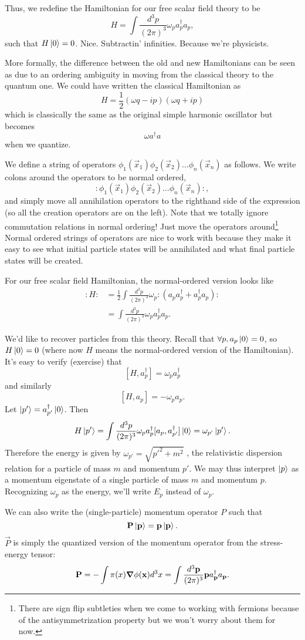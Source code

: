 Thus, we redefine the Hamiltonian for our free scalar field theory to be
$$H=\int \frac{d^3 p}{(2\pi)^3} \omega_p a_p^\dagger a_p,$$
such that $H\left| 0 \right>=0$. Nice. Subtractin' infinities. Because we're physicists.

More formally, the difference between the old and new Hamiltonians can be seen as due to an ordering ambiguity in moving from the classical theory to the quantum one. We could have written the classical Hamiltonian as
$$H=\frac{1}{2}(\omega q-ip)(\omega q+ ip)$$
which is classically the same as the original simple harmonic oscillator but becomes
$$\omega a^\dagger a$$ when we quantize.

\begin{defn}
We define a  string of operators $\phi_1(\vec x_1)\phi_2 (\vec x_2)\ldots \phi_n (\vec x_n)$ as follows.
We write colons around the operators to be normal ordered,
$$: \phi_1(\vec x_1)\phi_2 (\vec x_2)\ldots \phi_n (\vec x_n):,$$
and simply move all annihilation operators to the righthand side of the expression (so all the creation operators are on the left). Note that we totally ignore commutation relations in normal ordering! Just move the operators around\footnote{There are sign flip subtleties when we come to working with fermions because of the antisymmetrization property but we won't worry about them for now.} Normal ordered strings of operators are nice to work with because they make it easy to see what initial particle states will be annihilated and what final particle states will be created.
\end{defn}
\begin{exm}
For our free scalar field Hamiltonian, the normal-ordered version looks like
\begin{align*}
:H:&= \frac{1}{2} \int \frac{d^3p}{(2\pi)^3} \omega_p :(a_p a_p^\dagger + a_p^\dagger a_p):\\
&=\int \frac{d^3p}{(2\pi)^3} \omega_p a_p^\dagger a_p.
\end{align*}
\end{exm}

We'd like to recover particles from this theory. Recall that $\forall p, a_p\left| 0 \right>=0$, so $H\left| 0 \right>=0$ (where now $H$ means the normal-ordered version of the Hamiltonian). It's easy to verify (exercise) that
$$[H,a_p^\dagger] =\omega_p a_p^\dagger$$
and similarly
$$[H,a_p]=-\omega_p a_p.$$
Let $\left| p' \right>=a^\dagger_{p'}\left| 0 \right>$. Then
$$H\left| p' \right>=\int \frac{d^3 p}{(2\pi)^3} \omega_p a_p^\dagger [a_p, a_{p'}^\dagger]\left| 0 \right>=\omega_{p'}\left| p' \right>.$$
Therefore the energy is given by $\omega_{p'}=\sqrt{{p'}^2+m^2}$ , the relativistic dispersion relation for a particle of mass $m$ and momentum $p'$. We may thus interpret $\left| p \right>$ as a momentum eigenstate of a single particle of mass $m$ and momentum $p$. Recognizing $\omega_p$ as the energy, we'll write $E_p$ instead of $\omega_p$.

We can also write the (single-particle) momentum operator $P$ such that
$$\boldsymbol{\mathbf{P}}\left| \boldsymbol{\mathbf{p}} \right>=\boldsymbol{\mathbf{p}}\left| \boldsymbol{\mathbf{p}} \right>.$$
$\vec P$ is simply the quantized version of the momentum operator from the stress-energy tensor:
$$\boldsymbol{\mathbf{P}} =-\int \pi(x) \mbox{\boldmath$ \nabla $} \phi(\boldsymbol{\mathbf{x}})d^3 x=\int \frac{d^3 \boldsymbol{\mathbf{p}}}{(2\pi)^3} \boldsymbol{\mathbf{p}} a^\dagger_{\boldsymbol{\mathbf{p}}}a _{\boldsymbol{\mathbf{p}}}.$$